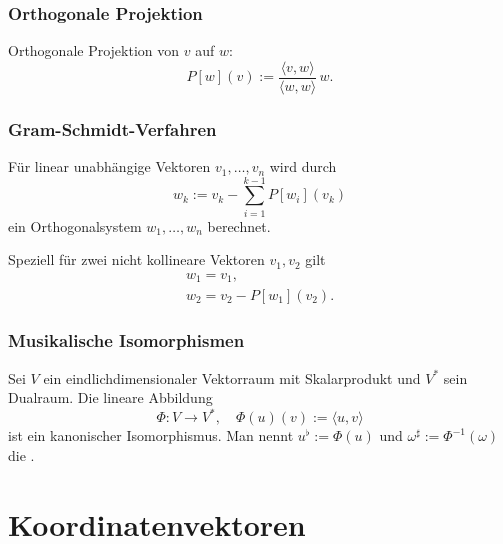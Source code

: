 \subsubsection{Orthogonale Projektion}
Orthogonale Projektion von $v$ auf $w$:
\begin{equation}
P[w](v) := \frac{\langle v,w\rangle}{\langle w,w\rangle}\,w.
\end{equation}
\subsubsection{Gram-Schmidt-Verfahren}
Für linear unabhängige Vektoren $v_1,\ldots,v_n$
wird durch%
\begin{equation}
w_k := v_k - \sum_{i=1}^{k-1} P[w_i](v_k)
\end{equation}
ein Orthogonalsystem $w_1,\ldots,w_n$ berechnet.

Speziell für zwei nicht kollineare Vektoren $v_1,v_2$ gilt
\begin{gather}
w_1=v_1,\\
w_2=v_2-P[w_1](v_2).
\end{gather}

\newpage
\subsubsection{Musikalische Isomorphismen}
\begin{definition}%
Sei $V$ ein eindlichdimensionaler Vektorraum
mit Skalarprodukt und $V^*$ sein Dualraum.
Die lineare Abbildung%
\begin{equation}
\Phi\colon V\to V^*,\quad \Phi(u)(v):=\langle u,v\rangle
\end{equation}
ist ein kanonischer Isomorphismus.%
Man nennt $u^\flat:=\Phi(u)$
und $\omega^\sharp:=\Phi^{-1}(\omega)$ die .
\end{definition}

\section{Koordinatenvektoren}
